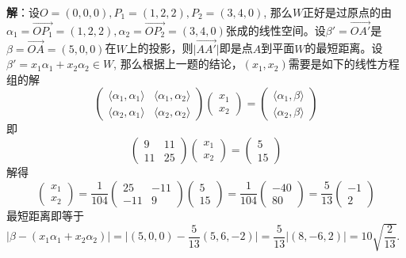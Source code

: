 
{\bf 解}：设$O = (0,0,0), P_1 = (1,2,2), P_2 = (3,4,0)$, 那么$W$正好是过原点的由$\alpha_1 = \overrightarrow{OP_1} = (1,2,2), \alpha_2 = \overrightarrow{OP_2} = (3,4,0)$张成的线性空间。设$\beta' = \overrightarrow{OA'}$是$\beta = \overrightarrow{OA} = (5,0,0)$在$W$上的投影，则$\lvert \overrightarrow{AA'} \rvert$即是点$A$到平面$W$的最短距离。设$\beta' = x_1 \alpha_1 + x_2 \alpha_2 \in W$, 那么根据上一题的结论，$(x_1, x_2)$需要是如下的线性方程组的解
$$
\begin{pmatrix}
\langle \alpha_1, \alpha_1 \rangle & \langle \alpha_1, \alpha_2 \rangle \\
\langle \alpha_2, \alpha_1 \rangle & \langle \alpha_2, \alpha_2 \rangle
\end{pmatrix}
\begin{pmatrix}
x_1 \\ x_2
\end{pmatrix} = 
\begin{pmatrix}
\langle \alpha_1, \beta \rangle \\
\langle \alpha_2, \beta \rangle
\end{pmatrix}
$$
即
$$
\begin{pmatrix}
9 & 11 \\ 11 & 25
\end{pmatrix}
\begin{pmatrix}
x_1 \\ x_2
\end{pmatrix} = 
\begin{pmatrix}
5 \\ 15
\end{pmatrix}
$$
解得
$$
\begin{pmatrix}
x_1 \\ x_2
\end{pmatrix} = \dfrac{1}{104} \begin{pmatrix}
25 & -11 \\ -11 & 9
\end{pmatrix}
\begin{pmatrix}
5 \\ 15
\end{pmatrix} = \dfrac{1}{104} \begin{pmatrix}
-40 \\ 80
\end{pmatrix} = \dfrac{5}{13}\begin{pmatrix}
-1 \\ 2
\end{pmatrix}
$$
最短距离即等于$\lvert \beta - (x_1\alpha_1 + x_2\alpha_2) \rvert = \lvert (5,0,0) - \dfrac{5}{13} (5,6,-2) \rvert = \dfrac{5}{13} \lvert (8,-6,2) \rvert = 10 \sqrt{\dfrac{2}{13}}$.

